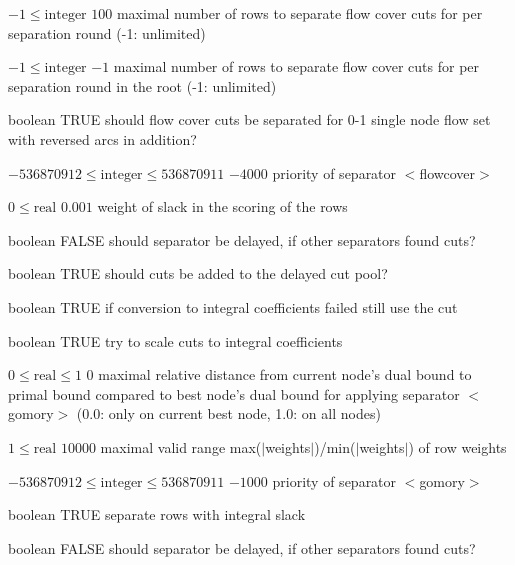 %
{$-1\leq\textrm{integer}$}%
{$100$}%
{maximal number of rows to separate flow cover cuts for per separation round (-1: unlimited)}%
{}

%
{$-1\leq\textrm{integer}$}%
{$-1$}%
{maximal number of rows to separate flow cover cuts for per separation round in the root (-1: unlimited)}%
{}

%
{boolean}%
{TRUE}%
{should flow cover cuts be separated for 0-1 single node flow set with reversed arcs in addition?}%
{}

%
{$-536870912\leq\textrm{integer}\leq536870911$}%
{$-4000$}%
{priority of separator $<$flowcover$>$}%
{}

%
{$0\leq\textrm{real}$}%
{$0.001$}%
{weight of slack in the scoring of the rows}%
{}

%
{boolean}%
{FALSE}%
{should separator be delayed, if other separators found cuts?}%
{}

%
{boolean}%
{TRUE}%
{should cuts be added to the delayed cut pool?}%
{}

%
{boolean}%
{TRUE}%
{if conversion to integral coefficients failed still use the cut}%
{}

%
{boolean}%
{TRUE}%
{try to scale cuts to integral coefficients}%
{}

%
{$0\leq\textrm{real}\leq1$}%
{$0$}%
{maximal relative distance from current node's dual bound to primal bound compared to best node's dual bound for applying separator $<$gomory$>$ (0.0: only on current best node, 1.0: on all nodes)}%
{}

%
{$1\leq\textrm{real}$}%
{$10000$}%
{maximal valid range max($|$weights$|$)/min($|$weights$|$) of row weights}%
{}

%
{$-536870912\leq\textrm{integer}\leq536870911$}%
{$-1000$}%
{priority of separator $<$gomory$>$}%
{}

%
{boolean}%
{TRUE}%
{separate rows with integral slack}%
{}

%
{boolean}%
{FALSE}%
{should separator be delayed, if other separators found cuts?}%
{}

